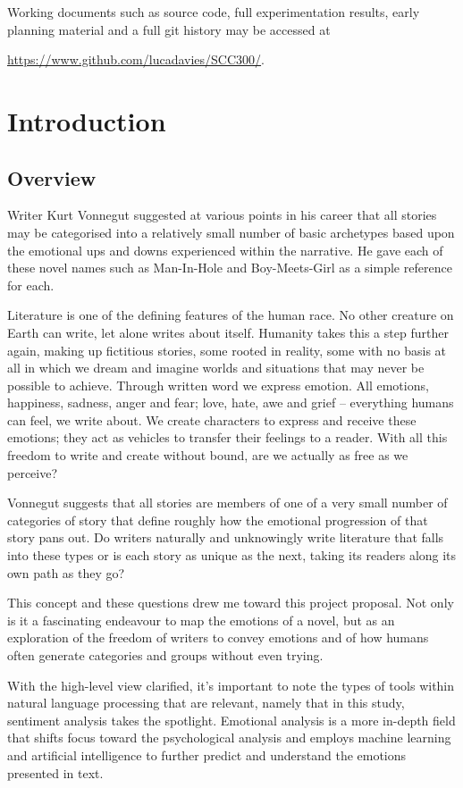 \documentclass{article}
\begin{document}
    Working documents such as source code, full experimentation results, early planning material and a full git history may be accessed at {\url{https://www.github.com/lucadavies/SCC300/}.
\newpage
\tableofcontents
\newpage
\section{Introduction}
    \subsection{Overview}
        Writer Kurt Vonnegut suggested at various points in his career that all stories may be categorised into a relatively small number of basic archetypes based upon the emotional ups and downs experienced within the narrative. He gave each of these novel names such as Man-In-Hole and Boy-Meets-Girl as a simple reference for each. \citep{vonnegutLecture}

        Literature is one of the defining features of the human race. No other creature on Earth can write, let alone writes about itself. Humanity takes this a step further again, making up fictitious stories, some rooted in reality, some with no basis at all in which we dream and imagine worlds and situations that may never be possible to achieve. Through written word we express emotion. All emotions, happiness, sadness, anger and fear; love, hate, awe and grief – everything humans can feel, we write about. We create characters to express and receive these emotions; they act as vehicles to transfer their feelings to a reader. With all this freedom to write and create without bound, are we actually as free as we perceive?

        Vonnegut suggests that all stories are members of one of a very small number of categories of story that define roughly how the emotional progression of that story pans out. Do writers naturally and unknowingly write literature that falls into these types or is each story as unique as the next, taking its readers along its own path as they go?

        This concept and these questions drew me toward this project proposal. Not only is it a fascinating endeavour to map the emotions of a novel, but as an exploration of the freedom of writers to convey emotions and of how humans often generate categories and groups without even trying.

        With the high-level view clarified, it's important to note the types of tools within natural language processing that are relevant, namely that in this study, sentiment analysis takes the spotlight. Emotional analysis is a more in-depth field that shifts focus toward the psychological analysis \citep{sentimentVsEmotionAnalysis} and employs machine learning and artificial intelligence to further predict and understand the emotions presented in text.
        
}
\end{document}
